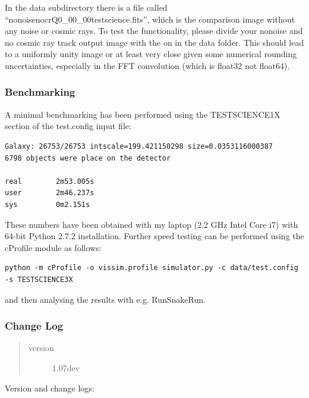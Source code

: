 \documentclass[a4paper,12pt,english]{sphinxmanual}
\begin{document}
In the data subdirectory there is a file called ``nonoisenocrQ0\_00\_00testscience.fits'',
which is the comparison image without any noise or cosmic rays. To test the functionality,
please divide your nonoise and no cosmic ray track output image with the on in the data
folder. This should lead to a uniformly unity image or at least very close given some
numerical rounding uncertainties, especially in the FFT convolution (which is float32 not
float64).


\subsubsection{Benchmarking}
\label{simulator:benchmarking}
A minimal benchmarking has been performed using the TESTSCIENCE1X section of the test.config input file:

\begin{Verbatim}[commandchars=\\\{\}]
Galaxy: 26753/26753 intscale=199.421150298 size=0.0353116000387
6798 objects were place on the detector

real        2m53.005s
user        2m46.237s
sys         0m2.151s
\end{Verbatim}

These numbers have been obtained with my laptop (2.2 GHz Intel Core i7) with
64-bit Python 2.7.2 installation. Further speed testing can be performed using the cProfile module
as follows:

\begin{Verbatim}[commandchars=\\\{\}]
python -m cProfile -o vissim.profile simulator.py -c data/test.config -s TESTSCIENCE3X
\end{Verbatim}

and then analysing the results with e.g. RunSnakeRun.


\subsubsection{Change Log}
\label{simulator:change-log}\begin{quote}\begin{description}
\item[{version}] \leavevmode
1.07dev

\end{description}\end{quote}

Version and change logs:
\end{document}
